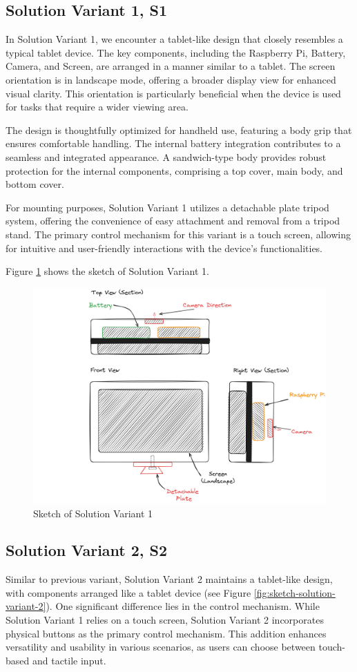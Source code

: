 \subsection{Solution Variant 1, S1}
In Solution Variant 1, we encounter a tablet-like design that closely resembles a typical tablet device. The key components, including the Raspberry Pi, Battery, Camera, and Screen, are arranged in a manner similar to a tablet. The screen orientation is in landscape mode, offering a broader display view for enhanced visual clarity. This orientation is particularly beneficial when the device is used for tasks that require a wider viewing area.

The design is thoughtfully optimized for handheld use, featuring a body grip that ensures comfortable handling. The internal battery integration contributes to a seamless and integrated appearance. A sandwich-type body provides robust protection for the internal components, comprising a top cover, main body, and bottom cover.

For mounting purposes, Solution Variant 1 utilizes a detachable plate tripod system, offering the convenience of easy attachment and removal from a tripod stand. The primary control mechanism for this variant is a touch screen, allowing for intuitive and user-friendly interactions with the device's functionalities.

Figure \ref{fig:sketch-solution-variant-1} shows the sketch of Solution Variant 1.

\begin{figure}[H]
    \centering
    \includegraphics[width=0.75\linewidth]{texs/Part1/chapter3/image/v1.png}
    \caption{Sketch of Solution Variant 1}
    \label{fig:sketch-solution-variant-1}
\end{figure}


\subsection{Solution Variant 2, S2}
Similar to previous variant, Solution Variant 2 maintains a tablet-like design, with components arranged like a tablet device (see Figure \ref{fig:sketch-solution-variant-2}). One significant difference lies in the control mechanism. While Solution Variant 1 relies on a touch screen, Solution Variant 2 incorporates physical buttons as the primary control mechanism. This addition enhances versatility and usability in various scenarios, as users can choose between touch-based and tactile input.

